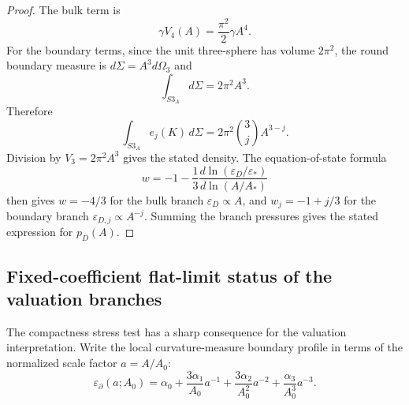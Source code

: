 \documentclass[11pt,a4paper]{article}
\def\Sthree{S3}%
\def\dd{d}%
\numberwithin{equation}{section}
\theoremstyle{definition}
\theoremstyle{plain}
\theoremstyle{remark}
\newcommand{\Sthree}{S^3}
\newcommand{\epsD}{\varepsilon_D}
\newcommand{\pD}{p_D}
\newcommand{\dd}{\mathrm{d}}
\begin{document}
\begin{proof}
The bulk term is
\begin{equation}
\gamma V_4(A)=\frac{\pi^2}{2}\gamma A^4.
\end{equation}
For the boundary terms, since the unit three-sphere has volume \(2\pi^2\), the round boundary measure is \(\dd\Sigma=A^3\dd\Omega_3\) and
\begin{equation}
\int_{\Sthree_A}\dd\Sigma=2\pi^2A^3.
\end{equation}
Therefore
\begin{equation}
\int_{\Sthree_A}e_j(K)\,\dd\Sigma
=2\pi^2\binom{3}{j}A^{3-j}.
\end{equation}
Division by \(V_3=2\pi^2A^3\) gives the stated density. The equation-of-state formula
\begin{equation}
w=-1-\frac{1}{3}\frac{\dd\ln(\epsD/\varepsilon_*)}{\dd\ln(A/A_*)}
\end{equation}
then gives \(w=-4/3\) for the bulk branch \(\epsD\propto A\), and \(w_j=-1+j/3\) for the boundary branch \(\varepsilon_{D,j}\propto A^{-j}\). Summing the branch pressures gives the stated expression for \(\pD(A)\).
\end{proof}



\subsection{Fixed-coefficient flat-limit status of the valuation branches}
The compactness stress test has a sharp consequence for the valuation interpretation.  Write the local curvature-measure boundary profile in terms of the normalized scale factor \(a=A/A_0\):
\begin{equation}
\varepsilon_{\partial}(a;A_0)
=\alpha_0+\frac{3\alpha_1}{A_0}a^{-1}
+\frac{3\alpha_2}{A_0^2}a^{-2}
+\frac{\alpha_3}{A_0^3}a^{-3}.
\end{equation}
\end{document}
